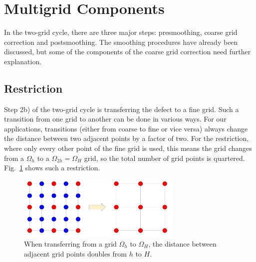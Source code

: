 \section{Multigrid Components}
In the two-grid cycle, there are three major steps: presmoothing, coarse grid correction and postsmoothing. The smoothing procedures have already been discussed, but some of the components of the coarse grid correction need further explanation. 

\subsection{Restriction}
Step 2b) of the two-grid cycle is transferring the defect to a fine grid. Such a transition from one grid to another can be done in various ways. For our applications, transitions (either from coarse to fine or vice versa) always change the distance between two adjacent points by a factor of two. For the restriction, where only every other point of the fine grid is used, this means the grid changes from a $\Omega_{h}$ to a $\Omega_{2h} = \Omega_H$ grid, so the total number of grid points is quartered. Fig.~\ref{fig:mg_restriction} shows such a restriction. 

\begin{figure}[h]
	\centering
	\includegraphics[width=0.7\textwidth]{chapters/chapter02/mg_restriktion}
	\caption{When transferring from a grid $\Omega_h$ to $\Omega_H$, the distance between adjacent grid points doubles from $h$ to $H$.}
	\label{fig:mg_restriction}
\end{figure}

